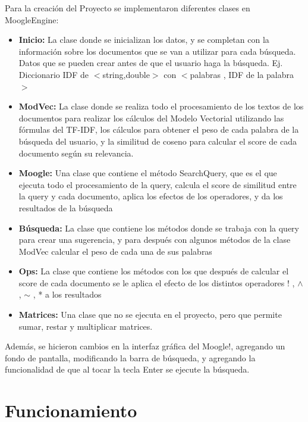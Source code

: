 \documentclass[12pt, a4paper]{article}
\begin{document}
Para la creación del Proyecto se implementaron diferentes clases en MoogleEngine:
\begin{itemize}
      \item \textbf{Inicio:} La clase donde se inicializan los datos, y se completan con la información sobre
            los documentos que se van a utilizar para cada búsqueda. Datos que se pueden crear
            antes de que el usuario haga la búsqueda.
            Ej. Diccionario IDF de $<$string,double$>$ con $<$palabras , IDF de la palabra$>$
      \item \textbf{ModVec:} La clase donde se realiza todo el procesamiento de los textos de los documentos
            para realizar los cálculos del Modelo Vectorial utilizando las fórmulas del TF-IDF,
            los cálculos para obtener el peso de cada palabra de la búsqueda del usuario,
            y la similitud de coseno para calcular el score de cada documento según su relevancia.
      \item \textbf{Moogle:} Una clase que contiene el método SearchQuery, que es el que ejecuta todo el procesamiento
            de la query, calcula el score de similitud entre la query y cada documento, aplica los efectos de los operadores,
            y da los resultados de la búsqueda
      \item \textbf{Búsqueda:} La clase que contiene los métodos donde se trabaja con la query para crear 
            una sugerencia, y para después con algunos métodos de la clase ModVec calcular el peso de cada 
            una de sus palabras
      \item \textbf{Ops:} La clase que contiene los métodos con los que después de calcular el score de
            cada documento se le aplica el efecto de los distintos operadores
            ! , $\wedge$ , $\sim$ , * a los resultados
      \item \textbf{Matrices:} Una clase que no se ejecuta en el proyecto, pero que permite sumar,
            restar y multiplicar matrices.

\end{itemize}
Además, se hicieron cambios en la interfaz gráfica del Moogle!,
agregando un fondo de pantalla, modificando la barra de búsqueda,
y agregando la funcionalidad de que al tocar la tecla Enter se
ejecute la búsqueda.

\section{Funcionamiento}
\end{document}
